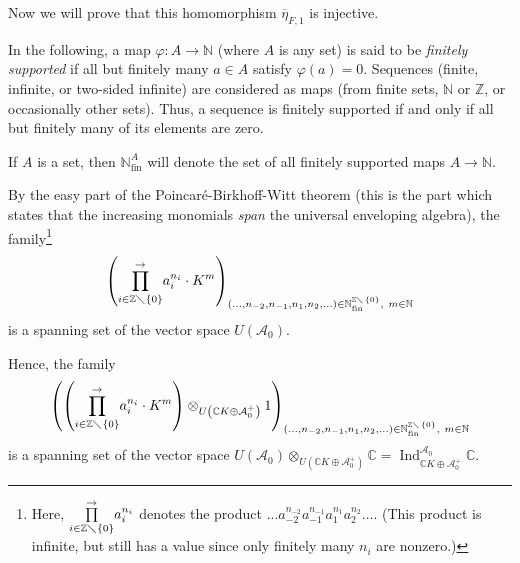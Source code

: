 \documentclass[etingof-lie.tex]{subfiles}
\begin{document}
Now we will prove that this homomorphism $\overline{\eta}_{F,1}$ is injective.

In the following, a map $\varphi:A\rightarrow\mathbb{N}$ (where $A$ is any
set) is said to be \textit{finitely supported} if all but finitely many $a\in
A$ satisfy $\varphi\left(  a\right)  =0$. Sequences (finite, infinite, or
two-sided infinite) are considered as maps (from finite sets, $\mathbb{N}$ or
$\mathbb{Z}$, or occasionally other sets). Thus, a sequence is finitely
supported if and only if all but finitely many of its elements are zero.

If $A$ is a set, then $\mathbb{N}_{\operatorname*{fin}}^{A}$ will denote the
set of all finitely supported maps $A\rightarrow\mathbb{N}$.

By the easy part of the Poincar\'{e}-Birkhoff-Witt theorem (this is the part
which states that the increasing monomials \textit{span} the universal
enveloping algebra), the family\footnote{Here, $\overset{\rightarrow
}{\prod\limits_{i\in\mathbb{Z}\diagdown\left\{  0\right\}  }}a_{i}^{n_{i}}$
denotes the product $...a_{-2}^{n_{-2}}a_{-1}^{n_{-1}}a_{1}^{n_{1}}%
a_{2}^{n_{2}}...$. (This product is infinite, but still has a value since only
finitely many $n_{i}$ are nonzero.)}%
\[
\left(  \overset{\rightarrow}{\prod\limits_{i\in\mathbb{Z}\diagdown\left\{
0\right\}  }}a_{i}^{n_{i}}\cdot K^{m}\right)  _{\left(  ...,n_{-2}%
,n_{-1},n_{1},n_{2},...\right)  \in\mathbb{N}_{\operatorname*{fin}%
}^{\mathbb{Z}\diagdown\left\{  0\right\}  },\ m\in\mathbb{N}}%
\]
is a spanning set of the vector space $U\left(  \mathcal{A}_{0}\right)  $.

Hence, the family%
\[
\left(  \left(  \overset{\rightarrow}{\prod\limits_{i\in\mathbb{Z}%
\diagdown\left\{  0\right\}  }}a_{i}^{n_{i}}\cdot K^{m}\right)  \otimes
_{U\left(  \mathbb{C}K\oplus\mathcal{A}_{0}^{+}\right)  }1\right)  _{\left(
...,n_{-2},n_{-1},n_{1},n_{2},...\right)  \in\mathbb{N}_{\operatorname*{fin}%
}^{\mathbb{Z}\diagdown\left\{  0\right\}  },\ m\in\mathbb{N}}%
\]
is a spanning set of the vector space $U\left(  \mathcal{A}_{0}\right)
\otimes_{U\left(  \mathbb{C}K\oplus\mathcal{A}_{0}^{+}\right)  }%
\mathbb{C}=\operatorname*{Ind}\nolimits_{\mathbb{C}K\oplus\mathcal{A}_{0}^{+}%
}^{\mathcal{A}_{0}}\mathbb{C}$.
\end{document}
